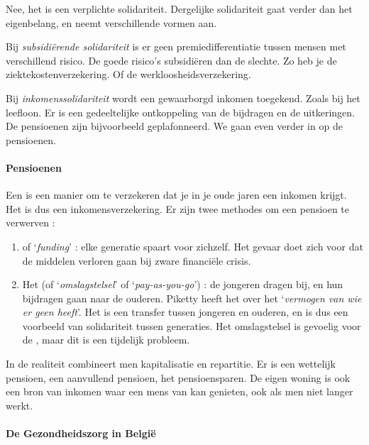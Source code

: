 \par Nee, het is een verplichte solidariteit. Dergelijke solidariteit gaat verder dan het eigenbelang, en neemt verschillende vormen aan. 
\par Bij \textit{subsidi\"erende solidariteit} is er geen premiedifferentiatie tussen mensen met verschillend risico. De goede risico's subsidi\"eren dan de slechte. Zo heb je de ziektekostenverzekering. Of de werkloosheidsverzekering.
\par Bij \textit{inkomenssolidariteit} wordt een gewaarborgd inkomen toegekend. Zoals bij het leefloon. Er is een gedeeltelijke ontkoppeling van de bijdragen en de uitkeringen. De pensioenen zijn bijvoorbeeld geplafonneerd. We gaan even verder in op de pensioenen.

\paragraph{Pensioenen}

Een  is een manier om te verzekeren dat je in je oude jaren een inkomen krijgt. Het is dus een inkomensverzekering. Er zijn twee methodes om een pensioen te verwerven :

\begin{enumerate}
\item {} of `\textit{funding}' : elke generatie spaart voor zichzelf. Het gevaar doet zich voor dat de middelen verloren gaan bij zware financi\"ele crisis.
\item Het  (of `\textit{omslagstelsel}' of `\textit{pay-as-you-go}') : de jongeren dragen bij, en hun bijdragen gaan naar de ouderen. Piketty heeft het over het `\textit{vermogen van wie er geen heeft}'. Het is een transfer tussen jongeren en ouderen, en is dus een voorbeeld van solidariteit tussen generaties. Het omslagstelsel is gevoelig voor de , maar dit is een tijdelijk probleem.
\end{enumerate}

In de realiteit combineert men kapitalisatie en repartitie. Er is een wettelijk pensioen, een aanvullend pensioen, het pensioensparen. De eigen woning is ook een bron van inkomen waar een mens van kan genieten, ook als men niet langer werkt.

\paragraph{De Gezondheidszorg in Belgi\"e}

